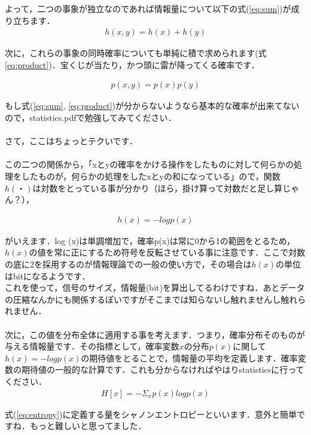 \documentclass[11pt,a4paper,uplatex]{ujreport}
\begin{document}
よって，二つの事象が独立なのであれば情報量について以下の式(\ref{eq:sum})が成り立ちます．
\begin{eqnarray}
\label{eq:sum}
h(x,y) = h(x) + h(y)
\end{eqnarray}

次に，これらの事象の同時確率についても単純に積で求められます(式\ref{eq:product})．宝くじが当たり，かつ頭に雷が降ってくる確率です．

\begin{eqnarray}
\label{eq:product}
p(x,y) = p(x)p(y)
\end{eqnarray}

もし式(\ref{eq:sum}, \ref{eq:product})が分からないようなら基本的な確率が出来てないので，statistics.pdfで勉強してみてください．\\
\\
さて，ここはちょっとテクいです．\\
\\
この二つの関係から，「xとyの確率をかける操作をしたものに対して何らかの処理をしたものが，何らかの処理をしたxとyの和になっている」ので，関数$h(・)$は対数をとっている事が分かり（ほら，掛け算って対数だと足し算じゃん？），

\begin{eqnarray}
h(x) = -log p(x)
\end{eqnarray}

がいえます．log (x)は単調増加で，確率p(x)は常に0から1の範囲をとるため，$h(x)$の値を常に正にするため符号を反転させている事に注意です．ここで対数の底に2を採用するのが情報理論での一般の使い方で，その場合は$h(x)$の単位はbitになるようです．\\

これを使って，信号のサイズ，情報量(bit)を算出してるわけですね．あとデータの圧縮なんかにも関係するぽいですがそこまでは知らないし触れませんし触れられません．\\
\\

次に，この値を分布全体に適用する事を考えます．つまり，確率分布そのものが与える情報量です．その指標として，確率変数$x$の分布$p(x)$に関して$h(x)=-log p(x)$の期待値をとることで，情報量の平均を定義します．確率変数の期待値の一般的な計算です．これも分からなければやはりstatisticsに行ってください．\\

\begin{eqnarray}
\label{eq:entropy}
H[x] = - \Sigma_{x} p(x) log p(x)
\end{eqnarray}

式(\ref{eq:entropy})に定義する量をシャノンエントロピーといいます\cite{prml}．意外と簡単ですね．もっと難しいと思ってました．\\
\\
\end{document}
